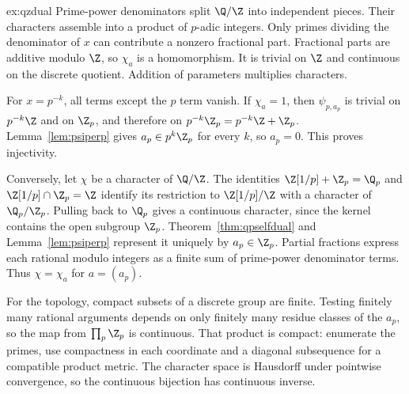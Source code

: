 \begin{solution}{ex:qzdual}
\idea Prime-power denominators split $\Q/\Z$ into independent pieces. Their characters assemble into a product of $p$-adic integers.
\writeup Only primes dividing the denominator of $x$ can contribute a nonzero fractional part. Fractional parts are additive modulo $\Z$, so $\chi_a$ is a homomorphism. It is trivial on $\Z$ and continuous on the discrete quotient. Addition of parameters multiplies characters.

For $x=p^{-k}$, all terms except the $p$ term vanish. If $\chi_a=1$, then $\psi_{p,a_p}$ is trivial on $p^{-k}\Z$ and on $\Z_p$, and therefore on $p^{-k}\Z_p=p^{-k}\Z+\Z_p$. Lemma~\ref{lem:psiperp} gives $a_p\in p^k\Z_p$ for every $k$, so $a_p=0$. This proves injectivity.

Conversely, let $\chi$ be a character of $\Q/\Z$. The identities $\Z[1/p]+\Z_p=\Q_p$ and $\Z[1/p]\cap\Z_p=\Z$ identify its restriction to $\Z[1/p]/\Z$ with a character of $\Q_p/\Z_p$. Pulling back to $\Q_p$ gives a continuous character, since the kernel contains the open subgroup $\Z_p$. Theorem~\ref{thm:qpselfdual} and Lemma~\ref{lem:psiperp} represent it uniquely by $a_p\in\Z_p$. Partial fractions express each rational modulo integers as a finite sum of prime-power denominator terms. Thus $\chi=\chi_a$ for $a=(a_p)$.

For the topology, compact subsets of a discrete group are finite. Testing finitely many rational arguments depends on only finitely many residue classes of the $a_p$, so the map from $\prod_p\Z_p$ is continuous. That product is compact: enumerate the primes, use compactness in each coordinate and a diagonal subsequence for a compatible product metric. The character space is Hausdorff under pointwise convergence, so the continuous bijection has continuous inverse.
\end{solution}
